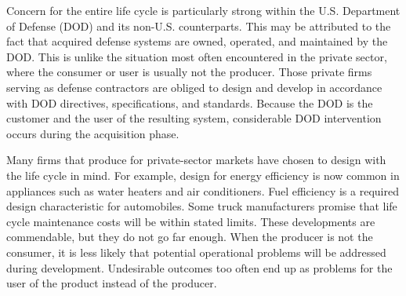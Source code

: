 Concern for the entire life cycle is particularly strong within the U.S. Department of Defense (DOD) and its non-U.S. counterparts. This may be attributed to the fact that acquired defense systems are owned, operated, and maintained by the DOD. This is unlike the situation most often encountered in the private sector, where the consumer or user is usually not the producer. Those private firms serving as defense contractors are obliged to design and develop in accordance with DOD directives, specifications, and standards. Because the DOD is the customer and the user of the resulting system, considerable DOD intervention occurs during the acquisition phase.

Many firms that produce for private-sector markets have chosen to design with the life cycle in mind. For example, design for energy efficiency is now common in appliances such as water heaters and air conditioners. Fuel efficiency is a required design characteristic for automobiles. Some truck manufacturers promise that life cycle maintenance costs will be within stated limits. These developments are commendable, but they do not go far enough. When the producer is not the consumer, it is less likely that potential operational problems will be addressed during development. Undesirable outcomes too often end up as problems for the user of the product instead of the producer.